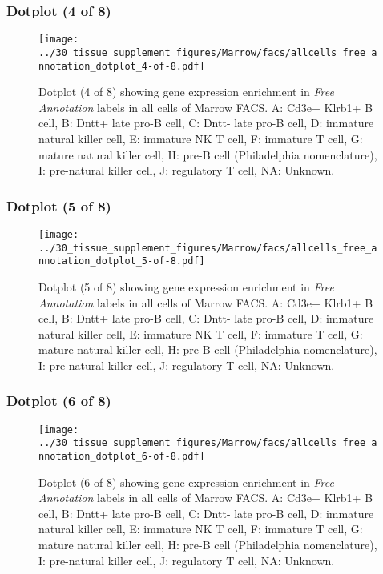 \clearpage

\subsubsection{Dotplot (4 of 8)}
\begin{figure}[h]
\centering
\texttt{[image: ../30\_tissue\_supplement\_figures/Marrow/facs/allcells\_free\_annotation\_dotplot\_4-of-8.pdf]}

\caption{ Dotplot (4 of 8)  showing gene expression enrichment in \emph{Free Annotation} labels in all cells of Marrow FACS. A: Cd3e+ Klrb1+ B cell, B: Dntt+ late pro-B cell, C: Dntt- late pro-B cell, D: immature natural killer cell, E: immature NK T cell, F: immature T cell, G: mature natural killer cell, H: pre-B cell (Philadelphia nomenclature), I: pre-natural killer cell, J: regulatory T cell, NA: Unknown.}
\end{figure}


\clearpage

\subsubsection{Dotplot (5 of 8)}
\begin{figure}[h]
\centering
\texttt{[image: ../30\_tissue\_supplement\_figures/Marrow/facs/allcells\_free\_annotation\_dotplot\_5-of-8.pdf]}

\caption{ Dotplot (5 of 8)  showing gene expression enrichment in \emph{Free Annotation} labels in all cells of Marrow FACS. A: Cd3e+ Klrb1+ B cell, B: Dntt+ late pro-B cell, C: Dntt- late pro-B cell, D: immature natural killer cell, E: immature NK T cell, F: immature T cell, G: mature natural killer cell, H: pre-B cell (Philadelphia nomenclature), I: pre-natural killer cell, J: regulatory T cell, NA: Unknown.}
\end{figure}


\clearpage

\subsubsection{Dotplot (6 of 8)}
\begin{figure}[h]
\centering
\texttt{[image: ../30\_tissue\_supplement\_figures/Marrow/facs/allcells\_free\_annotation\_dotplot\_6-of-8.pdf]}

\caption{ Dotplot (6 of 8)  showing gene expression enrichment in \emph{Free Annotation} labels in all cells of Marrow FACS. A: Cd3e+ Klrb1+ B cell, B: Dntt+ late pro-B cell, C: Dntt- late pro-B cell, D: immature natural killer cell, E: immature NK T cell, F: immature T cell, G: mature natural killer cell, H: pre-B cell (Philadelphia nomenclature), I: pre-natural killer cell, J: regulatory T cell, NA: Unknown.}
\end{figure}


